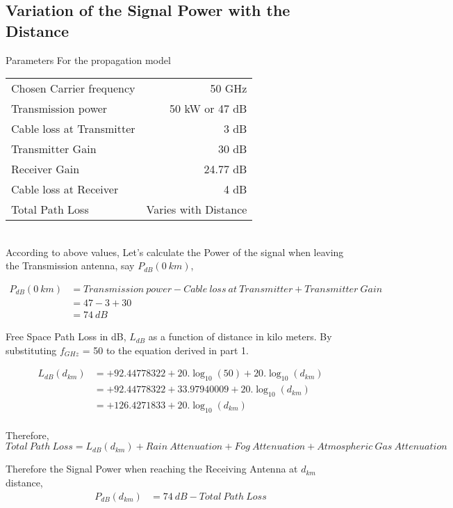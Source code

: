 \documentclass[a4paper,11pt]{article}%
\begin{document}
\pagebreak
\subsection{Variation of the Signal Power with the Distance}

Parameters For the propagation model\\

\begin{tabular}{l r}
Chosen Carrier frequency & 50 GHz\\
Transmission power & 50 kW or 47 dB\\
Cable loss at Transmitter & 3 dB\\
Transmitter Gain & 30 dB\\
Receiver Gain &24.77 dB\\
Cable loss at Receiver &4 dB\\
Total Path Loss & Varies with Distance\\
\end{tabular}\\[1cm]

According to above values, Let's calculate the Power of the signal when leaving the  Transmission antenna, say $P_{dB}(0~km)$,

\[
\begin{split}
P_{dB}(0~km) & = Transmission~power -  Cable~loss~at~Transmitter + Transmitter~Gain\\
&=47-3+30\\
&=74~dB
\end{split}
\]

Free Space Path Loss in dB, $L_{dB}$ as a function of distance in kilo meters. By substituting $f_{GHz}$ = 50 to the equation derived in part 1.

\[
\begin{split}
L_{dB}(d_{km})&= +92.44778322+20.\log_{10}(50) + 20.\log_{10}(d_{km})\\
&=+92.44778322+ 33.97940009 + 20.\log_{10}(d_{km})\\
&=+126.4271833+ 20.\log_{10}(d_{km})\\
\end{split}
\]

Therefore, \[Total~Path~Loss = L_{dB}(d_{km}) + Rain~Attenuation+Fog~Attenuation+Atmospheric~Gas~Attenuation \]

Therefore the Signal Power when reaching the Receiving Antenna at $d_{km}$ distance,
\[
\begin{split}
P_{dB}(d_{km}) & =74~dB - Total~Path~Loss
\end{split}
\]
\end{document}
